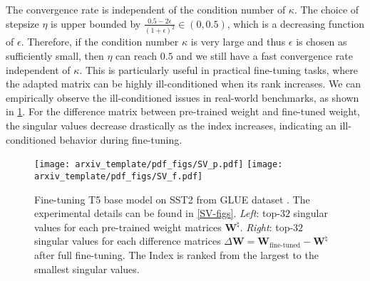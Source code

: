 The convergence rate is independent of the condition number of $\kappa$. The choice of stepsize $\eta$ is upper bounded by $\frac{0.5-2\epsilon}{(1+\epsilon)^2} \in (0,0.5)$, which is a decreasing function of $\epsilon$. 
Therefore, if the condition number $\kappa$ is very large and thus $\epsilon$ is chosen as sufficiently small, then $\eta$ can reach $0.5$ and we still have a fast convergence rate independent of $\kappa$.
This is particularly useful in practical fine-tuning tasks, where the adapted matrix can be highly ill-conditioned when its rank increases. We can empirically observe the ill-conditioned issues in real-world benchmarks, as shown in \cref{fig:SV}. For the difference matrix between pre-trained weight and fine-tuned weight, the singular values decrease drastically as the index increases, indicating an ill-conditioned behavior during fine-tuning.
\begin{figure}[h!]
    \centering
    \texttt{[image: arxiv\_template/pdf\_figs/SV\_p.pdf]}
    \texttt{[image: arxiv\_template/pdf\_figs/SV\_f.pdf]}
    \caption{Fine-tuning T5 base model \citep{raffel2020exploring} on SST2 from GLUE dataset \citep{wang2018glue}. The experimental details can be found in \cref{SV-figs}. \textit{Left}: top-$32$ singular values for each pre-trained weight matrices $\mathbf{W}^\natural$. \textit{Right}: top-$32$ singular values for each difference matrices $\Delta \mathbf{W} = \mathbf{W}_\text{fine-tuned} - \mathbf{W}^\natural$ after full fine-tuning. The Index is ranked from the largest to the smallest singular values.}
    \label{fig:SV}
\end{figure}